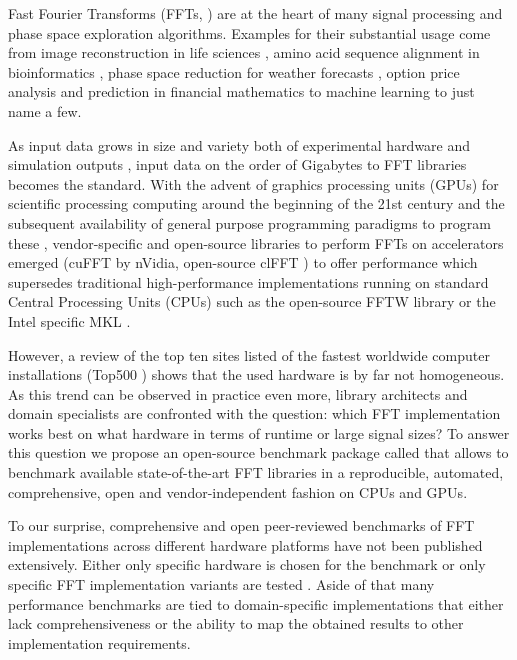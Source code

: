 Fast Fourier Transforms (FFTs, \citep{van1992computational}) are at the heart of many signal processing and phase space exploration algorithms. Examples for their substantial usage come from image reconstruction in life sciences \citep{preibisch2014efficient,schmid2015real}, amino acid sequence alignment in bioinformatics \citep{katoh2002mafft}, phase space reduction for weather forecasts \citep{maronga2015parallelized}, option price analysis and prediction in financial mathematics \citep{hurd2010fourier} to machine learning \citep{dlstudy} to just name a few.

As input data grows in size and variety both of experimental hardware \citep{huisken2004optical} and simulation outputs \citep{maronga2015parallelized}, input data on the order of Gigabytes to FFT libraries becomes the standard. With the advent of graphics processing units (GPUs) for scientific processing computing around the beginning of the 21st century and the subsequent availability of general purpose programming paradigms to program these \citep{du2012cuda}, vendor-specific and open-source libraries to perform FFTs on accelerators emerged (cuFFT \citep{nvidia2010cufft} by nVidia, open-source clFFT \citep{clfft}) to offer performance which supersedes traditional high-performance implementations running on standard Central Processing Units (CPUs) such as the open-source FFTW library \citep{FFTW05} or the Intel specific MKL \citep{intel2007intel}.

However, a review of the top ten sites listed of the fastest worldwide computer installations (Top500 \citep{meuer2011top500}) shows that the used hardware is by far not homogeneous. As this trend can be observed in practice even more, library architects and domain specialists are confronted with the question: which FFT implementation works best on what hardware in terms of runtime or large signal sizes?  
To answer this question we propose an open-source benchmark package called \gearshifft{} \citep{gearshifft_github} that allows to benchmark available state-of-the-art FFT libraries in a reproducible, automated, comprehensive, open and vendor-independent fashion on CPUs and GPUs.

To our surprise, comprehensive and open peer-reviewed benchmarks of FFT implementations across different hardware platforms have not been published extensively. Either only specific hardware is chosen for the benchmark \citep{park2015fast,eleftheriou2005performance} or only specific FFT implementation variants are tested \citep{shoc2010,dongarra2013hpc}. Aside of that many performance benchmarks are tied to domain-specific implementations \citep{fialka2006fft} that either lack comprehensiveness or the ability to map the obtained results to other implementation requirements.

